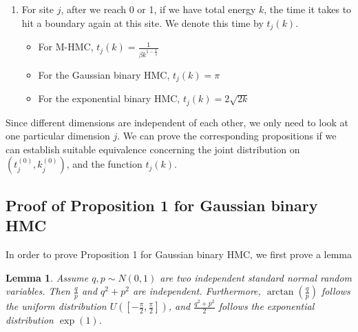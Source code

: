 \documentclass{article}
\newtheorem{lemma}{Lemma}
\begin{document}
\begin{enumerate}
\begin{itemize}
    \item For the Gaussian binary HMC sampler,
    \[ k_j^{(0)} = \frac{1}{2} (q_j^{(0)})^2 + \frac{1}{2} (p_j^{(0)})^2 \]
    where $q^{(0)}_j, p^{(0)}_j \sim N (0, 1)$.
    
    \item For the exponential binary HMC sampler,
    \[ k_j^{(0)} = q_j^{(0)} + \frac{1}{2} (p_j^{(0)})^2 \]
    where $q_j^{(0)} \sim \exp (1), p_j^{(0)} \sim N (0, 1)$.
  \end{itemize}
  \item For site $j$, after we reach 0 or 1, if we have total energy $k$, the time it takes to hit a boundary again at this site. We denote this time by $t_j (k)$.
  \begin{itemize}
    \item For M-HMC, $t_j (k) = \frac{1}{\beta k^{1 -
    \frac{1}{\beta}}}$
    
    \item For the Gaussian binary HMC, $t_j (k) = \pi$
    
    \item For the exponential binary HMC, $t_j (k) = 2 \sqrt{2 k}$
  \end{itemize}
\end{enumerate}
Since different dimensions are independent of each other, we only need to look
at one particular dimension $j$. We can prove the corresponding propositions
if we can establish suitable equivalence concerning the joint distribution on
$(t_j^{(0)}, k_j^{(0)})$, and the function $t_j (k)$.



\subsection{Proof of Proposition 1 for Gaussian binary HMC}

In order to prove Proposition 1 for Gaussian binary HMC, we first prove a lemma

\begin{lemma}\label{lem:gaussian_independent}
  Assume $q, p \sim N (0, 1)$ are two independent standard normal random
  variables. Then $\frac{q}{p}$ and $q^2 + p^2$ are independent. Furthermore,
  $\arctan \left( \frac{q}{p} \right)$ follows the uniform distribution $U
  \left( \left[ - \frac{\pi}{2}, \frac{\pi}{2} \right] \right)$, and
  $\frac{q^2 + p^2}{2}$ follows the exponential distribution $\exp (1)$.
\end{lemma}
\end{document}

